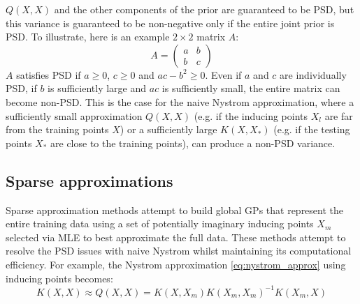 $Q(X, X)$ and the other components of the prior are guaranteed to be PSD, but this variance is guaranteed to be non-negative only if the entire joint prior is PSD. To illustrate, here is an example $2 \times 2$ matrix $A$:
\begin{equation*}
    A =
    \begin{pmatrix}
        a & b \\
        b & c
    \end{pmatrix}
\end{equation*}
$A$ satisfies PSD if $a \geq 0$, $c \geq 0$ and $ac - b^2 \geq 0$. Even if $a$ and $c$ are individually PSD, if $b$ is sufficiently large and $ac$ is sufficiently small, the entire matrix can become non-PSD. This is the case for the naive Nystrom approximation, where a sufficiently small approximation $Q(X, X)$ (e.g. if the inducing points $X_l$ are far from the training points $X$) or a sufficiently large $K(X, X_*)$ (e.g. if the testing points $X_*$ are close to the training points), can produce a non-PSD variance.

\subsection{Sparse approximations}
Sparse approximation methods attempt to build global GPs that represent the entire training data using a set of potentially imaginary inducing points $X_m$ selected via MLE to best approximate the full data. These methods attempt to resolve the PSD issues with naive Nystrom whilst maintaining its computational efficiency. For example, the Nystrom approximation \ref{eq:nystrom_approx} using inducing points becomes:
\begin{equation*}
    K(X, X) \approx Q(X, X) = K(X, X_m) K(X_m, X_m)^{-1} K(X_m, X)
\end{equation*}

